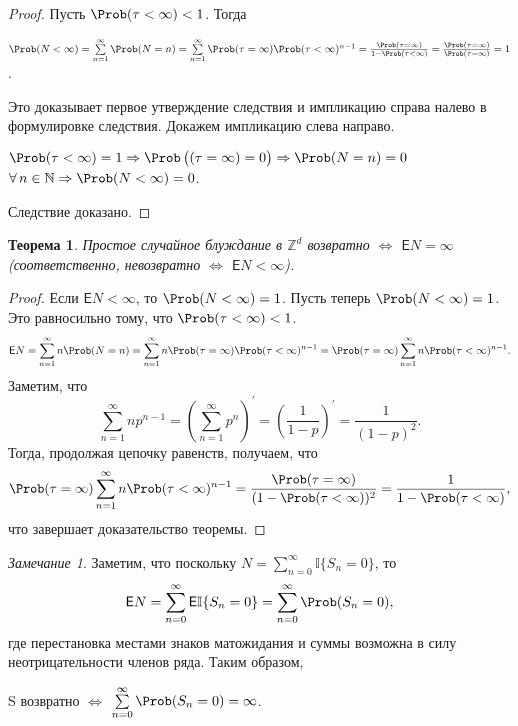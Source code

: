 \documentclass[a4paper]{article}
\newcommand{\Expect}{\mathsf{E}}
\newcommand{\ind}{\mathbb I}
\theoremstyle{plain}
\newtheorem{thm}{Теорема}[section]
\theoremstyle{definition}
\theoremstyle{remark}
\newtheorem*{rem}{Замечание}
\theoremstyle{nonumberplain}
\newtheorem{proof}{Доказательство}
\theoremstyle{nonumberplain}
\begin{document}
\begin{proof}
  Пусть $\Prob(\tau < \infty) < 1$. Тогда
  \begin{flushleft}
    $\Prob(N < \infty) = \sum\limits_{n=1}^{\infty} \Prob(N = n) = \sum\limits_{n=1}^{\infty} \Prob(\tau = \infty) \Prob(\tau < \infty)^{n-1} = \frac{\Prob(\tau = \infty)}{1 - \Prob(\tau < \infty)} = \frac{\Prob(\tau = \infty)}{\Prob(\tau = \infty)} = 1$.
  \end{flushleft}
  Это доказывает первое утверждение следствия и импликацию справа налево в формулировке следствия. Докажем импликацию слева направо.
  \begin{flushleft}
    $\Prob(\tau < \infty) = 1 \Rightarrow \Prob \left((\tau = \infty ) = 0 \right) \Rightarrow \Prob(N = n) = 0$ $\forall\, n \in \mathbb{N} \Rightarrow \Prob(N < \infty) = 0$.
  \end{flushleft}
  Следствие доказано.
\end{proof}

\begin{thm}
  Простое случайное блуждание в $\mathbb{Z}^{d}$ возвратно $\Leftrightarrow$ $\Expect N = \infty$ (соответственно, невозвратно $\Leftrightarrow$ $\Expect N < \infty$).
\end{thm}

\begin{proof}
  Если $\Expect N < \infty$, то $\Prob(N<\infty) = 1$.
  Пусть теперь $\Prob(N<\infty) = 1$. Это равносильно тому, что $\Prob(\tau < \infty) < 1$.
  \begin{equation*}
    \Expect N = \sum_{n=1}^{\infty} n\Prob(N=n) = \sum\limits_{n=1}^{\infty} n\Prob(\tau = \infty)\Prob(\tau < \infty)^{n-1} =\Prob(\tau = \infty)\sum\limits_{n=1}^{\infty} n\Prob(\tau < \infty)^{n-1}.
  \end{equation*}
  Заметим, что
  \begin{equation*}
    \sum_{n=1}^{\infty} np^{n-1} = (\sum\limits_{n=1}^{\infty} p^{n})^{\prime} = (\frac{1}{1-p})^{\prime} = \frac{1}{(1-p)^{2}}.
  \end{equation*}
  Тогда, продолжая цепочку равенств, получаем, что
  \begin{equation*}
    \Prob(\tau = \infty)\sum_{n=1}^{\infty} n\Prob(\tau < \infty)^{n-1} = \frac{\Prob(\tau = \infty)}{(1 - \Prob(\tau < \infty))^{2}} = \frac{1}{1 - \Prob(\tau < \infty)},
  \end{equation*}
  что завершает доказательство теоремы.
\end{proof}

\begin{rem}
  Заметим, что поскольку $N = \sum\limits_{n=0}^{\infty} \ind \lbrace S_{n} = 0 \rbrace$, то
  \begin{equation*}
    \Expect N = \sum_{n=0}^{\infty} \Expect \ind \lbrace S_{n} = 0 \rbrace = \sum\limits_{n=0}^{\infty} \Prob(S_{n} = 0),
  \end{equation*}
  где перестановка местами знаков матожидания и суммы возможна в силу неотрицательности членов ряда. Таким образом, \begin{center}
    S возвратно $\Leftrightarrow$ $\sum\limits_{n=0}^{\infty} \Prob(S_{n} = 0) = \infty$.
  \end{center}
\end{rem}
\end{document}

